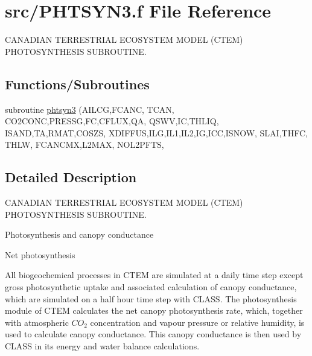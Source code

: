 \hypertarget{PHTSYN3_8f}{}\section{src/\+P\+H\+T\+S\+Y\+N3.f File Reference}
\label{PHTSYN3_8f}


C\+A\+N\+A\+D\+I\+A\+N T\+E\+R\+R\+E\+S\+T\+R\+I\+A\+L E\+C\+O\+S\+Y\+S\+T\+E\+M M\+O\+D\+E\+L (C\+T\+E\+M) P\+H\+O\+T\+O\+S\+Y\+N\+T\+H\+E\+S\+I\+S S\+U\+B\+R\+O\+U\+T\+I\+N\+E.  


\subsection*{Functions/\+Subroutines}
\begin{DoxyCompactItemize}
\item 
subroutine \hyperlink{PHTSYN3_8f_a9d3d9bffc5e2ae5e7d6411e23328f59c}{phtsyn3} (A\+I\+L\+C\+G,F\+C\+A\+N\+C, T\+C\+A\+N, C\+O2\+C\+O\+N\+C,P\+R\+E\+S\+S\+G,F\+C,C\+F\+L\+U\+X,Q\+A, Q\+S\+W\+V,I\+C,T\+H\+L\+I\+Q, I\+S\+A\+N\+D,T\+A,R\+M\+A\+T,C\+O\+S\+Z\+S, X\+D\+I\+F\+F\+U\+S,I\+L\+G,I\+L1,I\+L2,I\+G,I\+C\+C,I\+S\+N\+O\+W, S\+L\+A\+I,T\+H\+F\+C, T\+H\+L\+W, F\+C\+A\+N\+C\+M\+X,L2\+M\+A\+X, N\+O\+L2\+P\+F\+T\+S,
\end{DoxyCompactItemize}


\subsection{Detailed Description}
C\+A\+N\+A\+D\+I\+A\+N T\+E\+R\+R\+E\+S\+T\+R\+I\+A\+L E\+C\+O\+S\+Y\+S\+T\+E\+M M\+O\+D\+E\+L (C\+T\+E\+M) P\+H\+O\+T\+O\+S\+Y\+N\+T\+H\+E\+S\+I\+S S\+U\+B\+R\+O\+U\+T\+I\+N\+E. 

Photosynthesis and canopy conductance

Net photosynthesis

All biogeochemical processes in C\+T\+E\+M are simulated at a daily time step except gross photosynthetic uptake and associated calculation of canopy conductance, which are simulated on a half hour time step with C\+L\+A\+S\+S. The photosynthesis module of C\+T\+E\+M calculates the net canopy photosynthesis rate, which, together with atmospheric $CO_2$ concentration and vapour pressure or relative humidity, is used to calculate canopy conductance. This canopy conductance is then used by C\+L\+A\+S\+S in its energy and water balance calculations.

